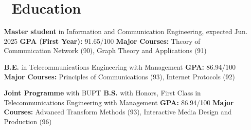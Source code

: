 \documentclass{resume}
\begin{document}



\section{\faGraduationCap\ Education}
\textbf{Master student} in Information and Communication Engineering, expected Jun. 2025 \newline
\textbf{GPA (First Year):} 91.65/100 \newline
\textbf{Major Courses:} Theory of Communication Network (90), Graph Theory and Applications (91)

\textbf{B.E.} in Telecommunications Engineering with Management \newline
\textbf{GPA:} 86.94/100 \newline
\textbf{Major Courses:} Principles of Communications (93), Internet Protocols (92)

\textbf{Joint Programme} with BUPT \newline
\textbf{B.S.} with Honors, First Class in Telecommunications Engineering with Management \newline
\textbf{GPA:} 86.94/100 \newline
\textbf{Major Courses:} Advanced Transform Methods (93), Interactive Media Design and Production (96)
\end{document}
